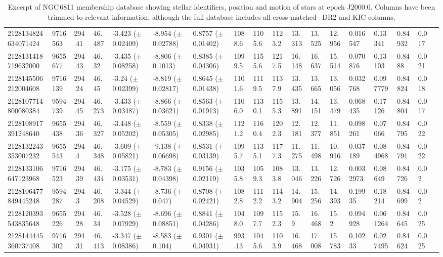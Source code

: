 \begin{sidewaystable}[htbp]
{\begin{tabular}{llllllllllllllllll}
        2128134824634071424 & 9716563 & 294.41 & 46.487 & -3.423 ($\pm$ 0.02409) & -8.954 ($\pm$ 0.02788) & 0.8757 ($\pm$ 0.01402) & 1088.6 & 1105.6 & 1123.2 & 13.313 & 13.525 & 12.956 & 0.016547 & 0.13341 & 0.84932 & 0.017 & \\
        2128131418719632000 & 9655677 & 294.43 & 46.32 & -3.435 ($\pm$ 0.08258) & -8.806 ($\pm$ 0.1013) & 0.8385 ($\pm$ 0.04306) & 1099.5 & 1155.6 & 1217.5 & 16.148 & 16.637 & 15.514 & 0.070876 & 0.13103 & 0.8488 & 0.021 & \\
        2128145506212004608 & 9716139 & 294.24 & 46.45 & -3.24 ($\pm$ 0.02399) & -8.819 ($\pm$ 0.02817) & 0.8645 ($\pm$ 0.01438) & 1101.6 & 1119.5 & 1137.9 & 13.435 & 13.665 & 13.056 & 0.032768 & 0.097779 & 0.84824 & 0.018 & \\
        2128107714800080384 & 9594739 & 294.45 & 46.273 & -3.433 ($\pm$ 0.03487) & -8.866 ($\pm$ 0.03621) & 0.8563 ($\pm$ 0.01913) & 1106.0 & 1130.1 & 1155.3 & 13.891 & 14.151 & 13.479 & 0.068435 & 0.17126 & 0.84804 & 0.017 & \\
        2128108917391248640 & 9655438 & 294.36 & 46.327 & -3.448 ($\pm$ 0.05202) & -8.559 ($\pm$ 0.05305) & 0.8338 ($\pm$ 0.02985) & 1121.2 & 1160.4 & 1202.3 & 12.181 & 12.377 & 11.851 & 0.098261 & 0.07066 & 0.84795 & 0.022 & \\
        2128132243353007232 & 9655543 & 294.4 & 46.348 & -3.609 ($\pm$ 0.05821) & -9.138 ($\pm$ 0.06698) & 0.8531 ($\pm$ 0.03139) & 1095.7 & 1135.1 & 1177.3 & 11.275 & 11.498 & 10.916 & 0.037189 & 0.084968 & 0.84791 & 0.022 & \\
        2128133106647123968 & 9716523 & 294.39 & 46.434 & -3.175 ($\pm$ 0.03531) & -8.783 ($\pm$ 0.04398) & 0.9156 ($\pm$ 0.02119) & 1035.8 & 1059.3 & 1083.8 & 13.046 & 13.226 & 12.726 & 0.0032973 & 0.08649 & 0.84726 & 0.02 & \\
        2128106477849445248 & 9594287 & 294.3 & 46.208 & -3.344 ($\pm$ 0.04529) & -8.736 ($\pm$ 0.047) & 0.8708 ($\pm$ 0.02421) & 1082.8 & 1112.2 & 1143.2 & 14.904 & 15.256 & 14.393 & 0.19935 & 0.18214 & 0.84699 & 0.02 & \\
        2128120393543835648 & 9655226 & 294.28 & 46.34 & -3.528 ($\pm$ 0.07929) & -8.696 ($\pm$ 0.08851) & 0.8841 ($\pm$ 0.04286) & 1048.0 & 1097.7 & 1152.3 & 15.9 & 16.468 & 15.2 & 0.094928 & 0.061264 & 0.84645 & 0.025 & \\
        2128144445360737408 & 9716302 & 294.31 & 46.413 & -3.347 ($\pm$ 0.08386) & -8.583 ($\pm$ 0.104) & 0.9301 ($\pm$ 0.04931) & 993.13 & 1045.6 & 1103.9 & 16.468 & 17.008 & 15.783 & 0.10233 & 0.027495 & 0.84624 & 0.025 & \\
        \bottomrule
    \end{tabular}
    }
    \caption[Excerpt of NGC\, 6811 membership database showing stellar identifiers, position and motion of stars at epoch J2000.0]{Excerpt of NGC\,6811 membership database showing stellar identifiers, position and motion of stars at epoch J2000.0. Columns have been trimmed to relevant information, although the full database includes all cross-matched \Gaia~DR2 and KIC columns.}
    \label{tab:6811mem}
\end{sidewaystable}
